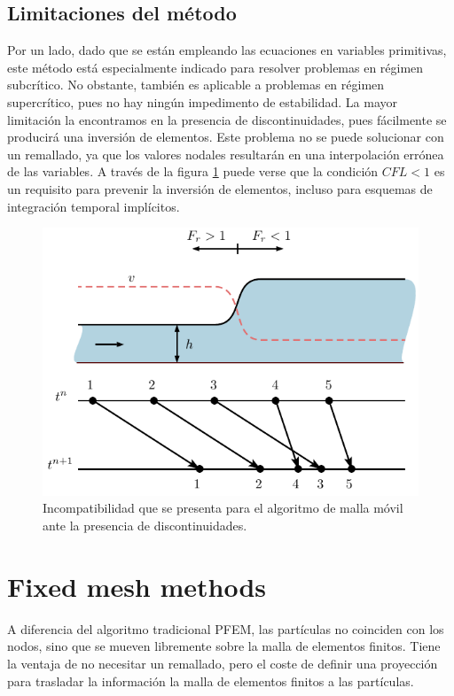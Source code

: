 \subsection{Limitaciones del método}

Por un lado, dado que se están empleando las ecuaciones en variables primitivas, este método está especialmente indicado para resolver problemas en régimen subcrítico. No obstante, también es aplicable a problemas en régimen supercrítico, pues no hay ningún impedimento de estabilidad. La mayor limitación la encontramos en la presencia de discontinuidades, pues fácilmente se producirá una inversión de elementos. Este problema no se puede solucionar con un remallado, ya que los valores nodales resultarán en una interpolación errónea de las variables. A través de la figura \ref{pfem_shock} puede verse que la condición $CFL<1$ es un requisito para prevenir la inversión de elementos, incluso para esquemas de integración temporal implícitos.

\begin{figure}
    \centering
    \includegraphics[width=.8\textwidth]{img/lagrangian/pfem_shock.pdf}
    \caption{Incompatibilidad que se presenta para el algoritmo de malla móvil ante la presencia de discontinuidades.}
    \label{pfem_shock}
\end{figure}



\section{Fixed mesh methods}

A diferencia del algoritmo tradicional PFEM, las partículas no coinciden con los nodos, sino que se mueven libremente sobre la malla de elementos finitos. Tiene la ventaja de no necesitar un remallado, pero el coste de definir una proyección para trasladar la información la malla de elementos finitos a las partículas.

